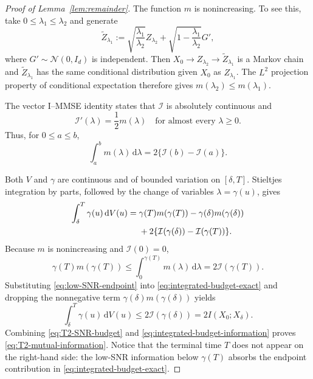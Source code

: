 \documentclass[11pt]{article}
\theoremstyle{definition}
\newcommand{\N}{\mathcal{N}}
\newcommand{\Id}{I_d}
\newcommand{\dd}{\,\mathrm{d}}
\begin{document}
\begin{proof}[Proof of Lemma~\ref{lem:remainder}]
The function $m$ is nonincreasing. To see this, take
$0\le\lambda_1\le\lambda_2$ and generate
\[
    \widetilde Z_{\lambda_1}
    :=
    \sqrt{\frac{\lambda_1}{\lambda_2}}Z_{\lambda_2}
    +\sqrt{1-\frac{\lambda_1}{\lambda_2}}G',
\]
where $G'\sim\N(0,\Id)$ is independent. Then
$X_0\to Z_{\lambda_2}\to\widetilde Z_{\lambda_1}$ is a Markov chain
and $\widetilde Z_{\lambda_1}$ has the same conditional distribution
given $X_0$ as $Z_{\lambda_1}$. The $L^2$ projection property of
conditional expectation therefore gives
$m(\lambda_2)\le m(\lambda_1)$.

The vector I--MMSE identity \citep{guo2005mutual} states that
$\mathcal I$ is absolutely continuous and
\begin{equation}
    \mathcal I'(\lambda)=\frac12m(\lambda)
    \quad\text{for almost every }\lambda\ge0.
    \label{eq:I-MMSE}
\end{equation}
Thus, for $0\le a\le b$,
\begin{equation}
    \int_a^b m(\lambda)\dd\lambda
    =2\{\mathcal I(b)-\mathcal I(a)\}.
    \label{eq:I-MMSE-integral}
\end{equation}

Both $V$ and $\gamma$ are continuous and of bounded variation on
$[\delta,T]$. Stieltjes integration by parts, followed by the change
of variables $\lambda=\gamma(u)$, gives
\begin{align}
    \int_\delta^T\gamma(u)\dd V(u)
    ={}&
    \gamma(T)m(\gamma(T))
    -\gamma(\delta)m(\gamma(\delta))
    \notag\\
    &+
    2\{\mathcal I(\gamma(\delta))-\mathcal I(\gamma(T))\}.
    \label{eq:integrated-budget-exact}
\end{align}
Because $m$ is nonincreasing and $\mathcal I(0)=0$,
\begin{equation}
    \gamma(T)m(\gamma(T))
    \le
    \int_0^{\gamma(T)}m(\lambda)\dd\lambda
    =2\mathcal I(\gamma(T)).
    \label{eq:low-SNR-endpoint}
\end{equation}
Substituting \eqref{eq:low-SNR-endpoint} into
\eqref{eq:integrated-budget-exact} and dropping the nonnegative term
$\gamma(\delta)m(\gamma(\delta))$ yields
\begin{equation}
    \int_\delta^T\gamma(u)\dd V(u)
    \le2\mathcal I(\gamma(\delta))
    =2I(X_0;X_\delta).
    \label{eq:integrated-budget-information}
\end{equation}
Combining \eqref{eq:T2-SNR-budget} and
\eqref{eq:integrated-budget-information} proves
\eqref{eq:T2-mutual-information}. Notice that the terminal time $T$
does not appear on the right-hand side: the low-SNR information below
$\gamma(T)$ absorbs the endpoint contribution in
\eqref{eq:integrated-budget-exact}.


\end{proof}
\end{document}
